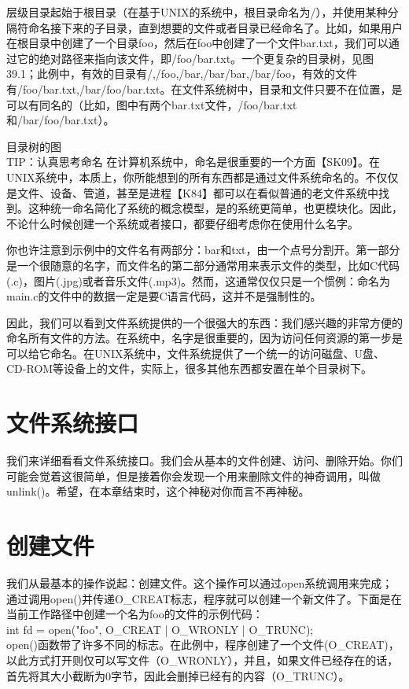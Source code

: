 层级目录起始于根目录（在基于UNIX的系统中，根目录命名为/），并使用某种分隔符命名接下来的子目录，直到想要的文件或者目录已经命名了。比如，如果用户在根目录中创建了一个目录foo，然后在foo中创建了一个文件bar.txt，我们可以通过它的绝对路径来指向该文件，即/foo/bar.txt。一个更复杂的目录树，见图39.1；此例中，有效的目录有/,/foo,/bar,/bar/bar,/bar/foo，有效的文件有/foo/bar.txt,/bar/foo/bar.txt。在文件系统树中，目录和文件只要不在位置，是可以有同名的（比如，图中有两个bar.txt文件，/foo/bar.txt和/bar/foo/bar.txt）。

目录树的图\\


TIP：认真思考命名
在计算机系统中，命名是很重要的一个方面【SK09】。在UNIX系统中，本质上，你所能想到的所有东西都是通过文件系统命名的。不仅仅是文件、设备、管道，甚至是进程【K84】都可以在看似普通的老文件系统中找到。这种统一命名简化了系统的概念模型，是的系统更简单，也更模块化。因此，不论什么时候创建一个系统或者接口，都要仔细考虑你在使用什么名字。

你也许注意到示例中的文件名有两部分：bar和txt，由一个点号分割开。第一部分是一个很随意的名字，而文件名的第二部分通常用来表示文件的类型，比如C代码(.c)，图片(.jpg)或者音乐文件(.mp3)。然而，这通常仅仅只是一个惯例：命名为main.c的文件中的数据一定是要C语言代码，这并不是强制性的。

因此，我们可以看到文件系统提供的一个很强大的东西：我们感兴趣的非常方便的命名所有文件的方法。在系统中，名字是很重要的，因为访问任何资源的第一步是可以给它命名。在UNIX系统中，文件系统提供了一个统一的访问磁盘、U盘、CD-ROM等设备上的文件，实际上，很多其他东西都安置在单个目录树下。


\section{文件系统接口}

我们来详细看看文件系统接口。我们会从基本的文件创建、访问、删除开始。你们可能会觉着这很简单，但是接着你会发现一个用来删除文件的神奇调用，叫做unlink()。希望，在本章结束时，这个神秘对你而言不再神秘。

\section{创建文件}

我们从最基本的操作说起：创建文件。这个操作可以通过open系统调用来完成；通过调用open()并传递O\_CREAT标志，程序就可以创建一个新文件了。下面是在当前工作路径中创建一个名为foo的文件的示例代码：\\
int fd = open("foo", O\_CREAT | O\_WRONLY | O\_TRUNC);\\
open()函数带了许多不同的标志。在此例中，程序创建了一个文件(O\_CREAT)，以此方式打开则仅可以写文件（O\_WRONLY），并且，如果文件已经存在的话，首先将其大小截断为0字节，因此会删掉已经有的内容（O\_TRUNC）。

